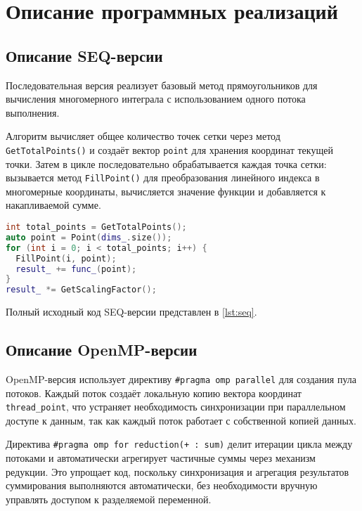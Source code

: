 \documentclass[a4paper,12pt]{article}
\begin{document}
  \newpage


  \section{Описание программных реализаций}\label{sec:implementations}

  \subsection{Описание SEQ-версии}\label{subsec:seq_impl}

  Последовательная версия реализует базовый метод прямоугольников для вычисления многомерного интеграла с использованием одного потока выполнения.

  Алгоритм вычисляет общее количество точек сетки через метод \texttt{GetTotalPoints()} и создаёт вектор \texttt{point} для хранения координат текущей точки.
  Затем в цикле последовательно обрабатывается каждая точка сетки: вызывается метод \texttt{FillPoint()} для преобразования линейного индекса в многомерные координаты, вычисляется значение функции и добавляется к накапливаемой сумме.

  \begin{lstlisting}[language=C++, caption=Ключевой фрагмент SEQ-версии,label={lst:seq-fragment}]
int total_points = GetTotalPoints();
auto point = Point(dims_.size());
for (int i = 0; i < total_points; i++) {
  FillPoint(i, point);
  result_ += func_(point);
}
result_ *= GetScalingFactor();
  \end{lstlisting}

  Полный исходный код SEQ-версии представлен в \autoref{lst:seq}.

  \subsection{Описание OpenMP-версии}\label{subsec:openmp_impl}

  OpenMP-версия использует директиву \texttt{\#pragma omp parallel} для создания пула потоков.
  Каждый поток создаёт локальную копию вектора координат \texttt{thread\_point}, что устраняет необходимость синхронизации при параллельном доступе к данным, так как каждый поток работает с собственной копией данных.

  Директива \texttt{\#pragma omp for reduction(+ : sum)} делит итерации цикла между потоками и автоматически агрегирует частичные суммы через механизм редукции.
  Это упрощает код, поскольку синхронизация и агрегация результатов суммирования выполняются автоматически, без необходимости вручную управлять доступом к разделяемой переменной.
\end{document}
